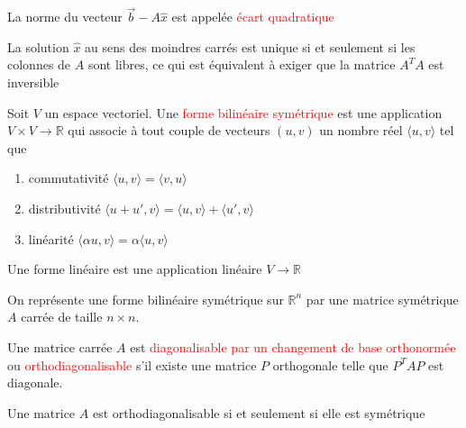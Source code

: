     \begin{definition}
        La norme du vecteur $\vec{b}-A\hat{x}$ est appelée \textcolor{red}{écart quadratique}
    \end{definition}
    \begin{theoreme}
        La solution $\hat{x}$ au sens des moindres carrés est unique si et seulement si les colonnes de $A$ sont libres, ce qui est équivalent à exiger que la matrice $A^TA$ est inversible
    \end{theoreme}
            \begin{definition}
                Soit $V$ un espace vectoriel. Une \textcolor{red}{forme bilinéaire symétrique} est une application $V \times V \to \mathbb{R}$ qui associe à tout couple de vecteurs $(u, v)$ un nombre réel $\langle u, v \rangle$ tel que
                \begin{enumerate}
                    \item commutativité $\langle u, v \rangle = \langle v, u \rangle$
                    \item distributivité $\langle u + u', v \rangle = \langle u, v \rangle + \langle u' , v \rangle$
                    \item linéarité $\langle \alpha u, v \rangle = \alpha \langle u, v \rangle$
                \end{enumerate}
                \begin{framedremark}
                    Une forme linéaire est une application linéaire $V \to \mathbb{R}$
                \end{framedremark}
            \end{definition}
                \begin{theoreme}
                    On représente une forme bilinéaire symétrique sur $\mathbb{R}^n$ par une matrice symétrique $A$ carrée de taille $n \times n$. 
                \end{theoreme}
            \begin{definition}
                Une matrice carrée $A$ est \textcolor{red}{diagonalisable par un changement de base orthonormée} ou \textcolor{red}{orthodiagonalisable} s'il existe une matrice $P$ orthogonale telle que $P^TAP$ est diagonale.
            \end{definition}
            \begin{theoreme}
                Une matrice $A$ est orthodiagonalisable si et seulement si elle est symétrique
            \end{theoreme}
